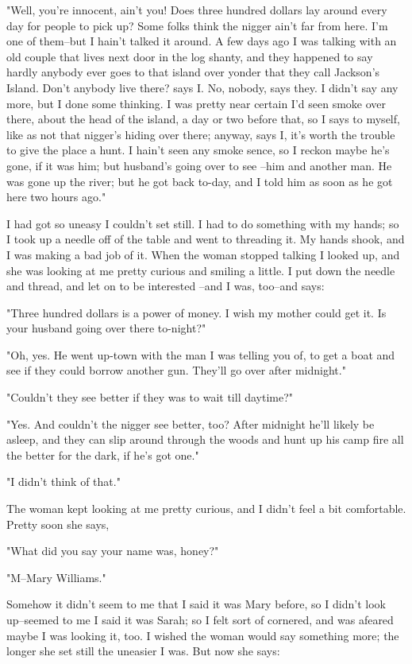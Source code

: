 "Well, you're innocent, ain't you!  Does three hundred dollars lay around
every day for people to pick up?  Some folks think the nigger ain't far
from here.  I'm one of them--but I hain't talked it around.  A few days
ago I was talking with an old couple that lives next door in the log
shanty, and they happened to say hardly anybody ever goes to that island
over yonder that they call Jackson's Island.  Don't anybody live there?
says I. No, nobody, says they.  I didn't say any more, but I done some
thinking.  I was pretty near certain I'd seen smoke over there, about the
head of the island, a day or two before that, so I says to myself, like
as not that nigger's hiding over there; anyway, says I, it's worth the
trouble to give the place a hunt.  I hain't seen any smoke sence, so I
reckon maybe he's gone, if it was him; but husband's going over to see
--him and another man.  He was gone up the river; but he got back to-day,
and I told him as soon as he got here two hours ago."

I had got so uneasy I couldn't set still.  I had to do something with my
hands; so I took up a needle off of the table and went to threading it.
My hands shook, and I was making a bad job of it.  When the woman stopped
talking I looked up, and she was looking at me pretty curious and smiling
a little.  I put down the needle and thread, and let on to be interested
--and I was, too--and says:

"Three hundred dollars is a power of money.  I wish my mother could get
it. Is your husband going over there to-night?"

"Oh, yes.  He went up-town with the man I was telling you of, to get a
boat and see if they could borrow another gun.  They'll go over after
midnight."

"Couldn't they see better if they was to wait till daytime?"

"Yes.  And couldn't the nigger see better, too?  After midnight he'll
likely be asleep, and they can slip around through the woods and hunt up
his camp fire all the better for the dark, if he's got one."

"I didn't think of that."

The woman kept looking at me pretty curious, and I didn't feel a bit
comfortable.  Pretty soon she says,

"What did you say your name was, honey?"

"M--Mary Williams."

Somehow it didn't seem to me that I said it was Mary before, so I didn't
look up--seemed to me I said it was Sarah; so I felt sort of cornered,
and was afeared maybe I was looking it, too.  I wished the woman would
say something more; the longer she set still the uneasier I was.  But now
she says:

